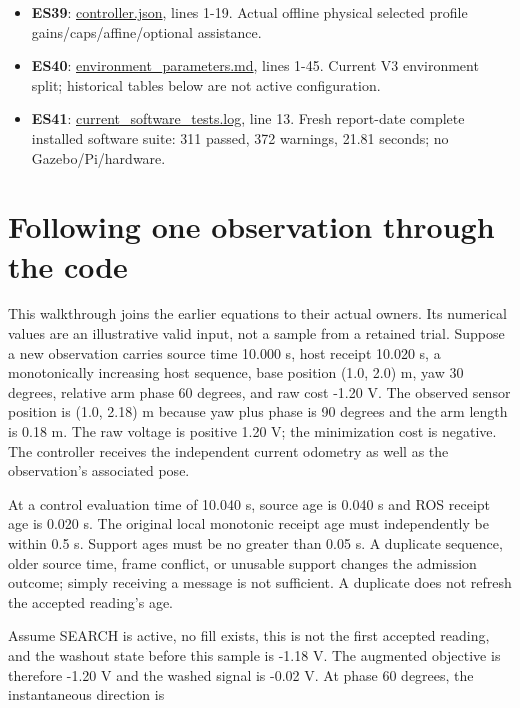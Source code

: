 \documentclass[
  10pt,
  letterpaper,
]{article}
\begin{document}
\begin{itemize}
  command; tuning unchanged.
\item
  \textbf{ES39}:
  \href{/home/mattb/physical_TB3_files_snapshot/pi/ros2_ws/src/ros_esc/config/profiles/assets/gesc_v3/controller.json:1}{controller.json},
  lines 1-19. Actual offline physical selected profile
  gains/caps/affine/optional assistance.
\item
  \textbf{ES40}:
  \href{/home/mattb/dsim-lab/docs/environment_parameters.md:1}{environment\_parameters.md},
  lines 1-45. Current V3 environment split; historical tables below are
  not active configuration.
\item
  \textbf{ES41}:
  \href{/home/mattb/Experiments/GESC-Gaussian/v3/report_20261005/current_software_tests.log:13}{current\_software\_tests.log},
  line 13. Fresh report-date complete installed software suite: 311
  passed, 372 warnings, 21.81 seconds; no Gazebo/Pi/hardware.
\end{itemize}

\section{Following one observation through the
code}\label{following-one-observation-through-the-code}

This walkthrough joins the earlier equations to their actual owners. Its
numerical values are an illustrative valid input, not a sample from a
retained trial. Suppose a new observation carries source time 10.000 s,
host receipt 10.020 s, a monotonically increasing host sequence, base
position (1.0, 2.0) m, yaw 30 degrees, relative arm phase 60 degrees,
and raw cost -1.20 V. The observed sensor position is (1.0, 2.18) m
because yaw plus phase is 90 degrees and the arm length is 0.18 m. The
raw voltage is positive 1.20 V; the minimization cost is negative. The
controller receives the independent current odometry as well as the
observation's associated pose.

At a control evaluation time of 10.040 s, source age is 0.040 s and ROS
receipt age is 0.020 s. The original local monotonic receipt age must
independently be within 0.5 s. Support ages must be no greater than 0.05
s. A duplicate sequence, older source time, frame conflict, or unusable
support changes the admission outcome; simply receiving a message is not
sufficient. A duplicate does not refresh the accepted reading's age.

Assume SEARCH is active, no fill exists, this is not the first accepted
reading, and the washout state before this sample is -1.18 V. The
augmented objective is therefore -1.20 V and the washed signal is -0.02
V. At phase 60 degrees, the instantaneous direction is
\end{document}
